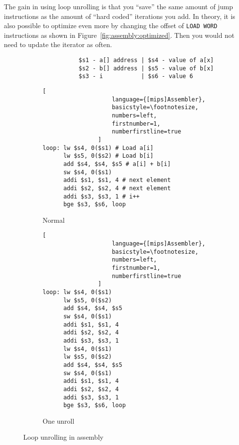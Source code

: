 The gain in using loop unrolling is that you \enquote{save} the same amount of jump instructions as the amount of \enquote{hard coded} iterations you add. In theory, it is also possible to optimize even more by changing the offset of \texttt{LOAD WORD} instructions as shown in Figure~\ref{fig:assembly:optimized}. Then you would not need to update the iterator as often.


\begin{figure}
    \centering
    \begin{adjustbox}{minipage=\linewidth,scale=0.8}
        \begin{verbatim}
                $s1 - a[] address | $s4 - value of a[x]
                $s2 - b[] address | $s5 - value of b[x]
                $s3 - i           | $s6 - value 6
        \end{verbatim}
        \begin{subfigure}{.55\textwidth}
            \centering
            \begin{lstlisting}[
                    language={[mips]Assembler},
                    basicstyle=\footnotesize,
                    numbers=left,
                    firstnumber=1,
                    numberfirstline=true
                ]
loop: lw $s4, 0($s1) # Load a[i]
      lw $s5, 0($s2) # Load b[i]
      add $s4, $s4, $s5 # a[i] + b[i]
      sw $s4, 0($s1)
      addi $s1, $s1, 4 # next element
      addi $s2, $s2, 4 # next element
      addi $s3, $s3, 1 # i++
      bge $s3, $s6, loop
                \end{lstlisting}
            \caption{Normal}
            \label{fig:unroll:sub1}
        \end{subfigure}%
        \begin{subfigure}{.3\textwidth}
            \centering
            \begin{lstlisting}[
                    language={[mips]Assembler},
                    basicstyle=\footnotesize,
                    numbers=left,
                    firstnumber=1,
                    numberfirstline=true
                ]
loop: lw $s4, 0($s1)
      lw $s5, 0($s2)
      add $s4, $s4, $s5
      sw $s4, 0($s1)
      addi $s1, $s1, 4
      addi $s2, $s2, 4
      addi $s3, $s3, 1
      lw $s4, 0($s1)
      lw $s5, 0($s2)
      add $s4, $s4, $s5
      sw $s4, 0($s1)
      addi $s1, $s1, 4
      addi $s2, $s2, 4
      addi $s3, $s3, 1
      bge $s3, $s6, loop
                \end{lstlisting}
            \caption{One unroll}
            \label{fig:unroll:sub2}
        \end{subfigure}
    \end{adjustbox}
    \caption{Loop unrolling in assembly}
    \label{fig:assembly:unroll}
\end{figure}


